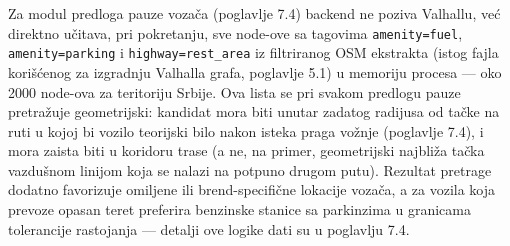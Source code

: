 Za modul predloga pauze vozača (poglavlje 7.4) backend ne poziva Valhallu, već direktno učitava, pri pokretanju, sve node-ove sa tagovima \texttt{amenity=fuel}, \texttt{amenity=parking} i \texttt{highway=rest\_area} iz filtriranog OSM ekstrakta (istog fajla korišćenog za izgradnju Valhalla grafa, poglavlje 5.1) u memoriju procesa — oko 2000 node-ova za teritoriju Srbije. Ova lista se pri svakom predlogu pauze pretražuje geometrijski: kandidat mora biti unutar zadatog radijusa od tačke na ruti u kojoj bi vozilo teorijski bilo nakon isteka praga vožnje (poglavlje 7.4), i mora zaista biti u koridoru trase (a ne, na primer, geometrijski najbliža tačka vazdušnom linijom koja se nalazi na potpuno drugom putu). Rezultat pretrage dodatno favorizuje omiljene ili brend-specifične lokacije vozača, a za vozila koja prevoze opasan teret preferira benzinske stanice sa parkinzima u granicama tolerancije rastojanja — detalji ove logike dati su u poglavlju 7.4.

\clearpage
